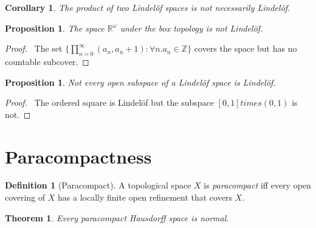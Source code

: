 \documentclass{report}
\let\qed\relax
\newtheorem{prop}[lm]{Proposition}
\newtheorem{thm}[lm]{Theorem}
\newtheorem{cor}{Corollary}[lm]
\theoremstyle{definition}
\newtheorem{df}[lm]{Definition}
\begin{document}
\begin{cor}
  The product of two Lindel\"{o}f spaces is not necessarily Lindel\"{o}f.
\end{cor}

\begin{prop}
	The space $\mathbb{R}^\omega$ under the box topology is not Lindel\"{o}f.
\end{prop}

\begin{proof}
	\pf\ The set $\{ \prod_{n=0}^\infty (a_n, a_n + 1) : \forall n. a_n \in \mathbb{Z} \}$ covers the space but has no countable subcover. \qed
\end{proof}

\begin{prop}
  Not every open subspace of a Lindel\"{o}f space is Lindel\"{o}f.
\end{prop}

\begin{proof}
  \pf\ The ordered square is Lindel\"{o}f but the subspace $[0,1]
  times (0,1)$ is not. \qed
\end{proof}

\section{Paracompactness}

\begin{df}[Paracompact]
  A topological space $X$ is \emph{paracompact} iff every open covering of $X$ has a locally finite open refinement that covers $X$.
\end{df}

\begin{thm}
  Every paracompact Hausdorff space is normal.
\end{thm}
\end{document}

